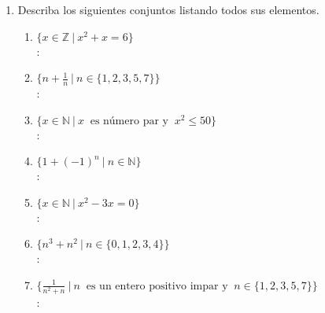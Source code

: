 \begin{enumerate}[label=1.1.\arabic*.]
\begin{enumerate}[label=(\arabic*)]
	\end{enumerate}

	\item Describa los siguientes conjuntos listando todos sus elementos.
	\begin{enumerate}[label=(\arabic*)]
		\item $ \{ x \in \mathbb{Z} \ | \ x^2 + x = 6 \} $ \\
		\solucion: \\
		
		\item $ \{ n + \frac{1}{n} \ | \ n \in \{ 1, 2, 3, 5, 7 \} \} $ \\
		\solucion: \\
		
		\item $ \{ x \in \mathbb{N} \ | \ x \ \text{ es número par y } \ x^2 \leq 50 \} $ \\
		\solucion: \\
		
		\item $ \{ 1 + (-1)^n \ | \ n \in \mathbb{N} \} $ \\
		\solucion: \\
		
		\item $ \{ x \in \mathbb{N} \ | \ x^2 - 3x = 0 \} $ \\
		\solucion: \\
		
		\item $ \{ n^3 + n^2 \ | \ n \in \{ 0, 1, 2, 3, 4 \} \} $ \\
		\solucion: \\
		
		\item $ \{ \frac{1}{n^2 + n} \ | \ n \ \text{ es un entero positivo impar y } \ n \in \{ 1,2,3,5,7 \} \} $ \\
		\solucion: \\
		
	\end{enumerate}


\end{enumerate}
